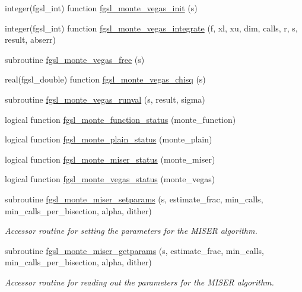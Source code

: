 \begin{DoxyCompactItemize}
integer(fgsl\-\_\-int) function \hyperlink{montecarlo_8finc_a7b50efe16a1796a72f05bb26779481de}{fgsl\-\_\-monte\-\_\-vegas\-\_\-init} (s)
\item 
integer(fgsl\-\_\-int) function \hyperlink{montecarlo_8finc_a6ca1e03b2c16419ff948d52426d89066}{fgsl\-\_\-monte\-\_\-vegas\-\_\-integrate} (f, xl, xu, dim, calls, r, s, result, abserr)
\item 
subroutine \hyperlink{montecarlo_8finc_a6bcca41c04f47eb0018123519c6c4225}{fgsl\-\_\-monte\-\_\-vegas\-\_\-free} (s)
\item 
real(fgsl\-\_\-double) function \hyperlink{montecarlo_8finc_a2126d5635d3ae538e905c2ab9739628a}{fgsl\-\_\-monte\-\_\-vegas\-\_\-chisq} (s)
\item 
subroutine \hyperlink{montecarlo_8finc_abfa67b6ebc24ac8ecfeb67102151a0db}{fgsl\-\_\-monte\-\_\-vegas\-\_\-runval} (s, result, sigma)
\item 
logical function \hyperlink{montecarlo_8finc_a54997aeeb57044a0d1ea66536cef086d}{fgsl\-\_\-monte\-\_\-function\-\_\-status} (monte\-\_\-function)
\item 
logical function \hyperlink{montecarlo_8finc_a3f0ffca084fe0aa10a2364ae1c12141d}{fgsl\-\_\-monte\-\_\-plain\-\_\-status} (monte\-\_\-plain)
\item 
logical function \hyperlink{montecarlo_8finc_a882c25d3ff7ba5048ee146da2af617d6}{fgsl\-\_\-monte\-\_\-miser\-\_\-status} (monte\-\_\-miser)
\item 
logical function \hyperlink{montecarlo_8finc_a46e22adcca8c7275e4de953205759d11}{fgsl\-\_\-monte\-\_\-vegas\-\_\-status} (monte\-\_\-vegas)
\item 
subroutine \hyperlink{montecarlo_8finc_ad5c6366b571b8d0f4caa29ef51302fcf}{fgsl\-\_\-monte\-\_\-miser\-\_\-setparams} (s, estimate\-\_\-frac, min\-\_\-calls, min\-\_\-calls\-\_\-per\-\_\-bisection, alpha, dither)
\begin{DoxyCompactList}\small\item\em Accessor routine for setting the parameters for the M\-I\-S\-E\-R algorithm. \end{DoxyCompactList}\item 
subroutine \hyperlink{montecarlo_8finc_a408686480497f6952e5dff7bf5d54603}{fgsl\-\_\-monte\-\_\-miser\-\_\-getparams} (s, estimate\-\_\-frac, min\-\_\-calls, min\-\_\-calls\-\_\-per\-\_\-bisection, alpha, dither)
\begin{DoxyCompactList}\small\item\em Accessor routine for reading out the parameters for the M\-I\-S\-E\-R algorithm. \end{DoxyCompactList}\item 

\end{DoxyCompactItemize}
